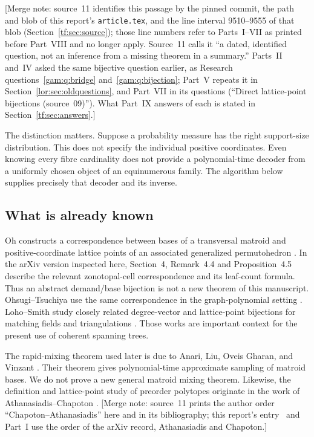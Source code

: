 \documentclass[11pt]{article}
\numberwithin{equation}{section}
\theoremstyle{definition}
\begin{document}
[Merge note: source~11 identifies this passage by the pinned commit, the
path and blob of this report's \texttt{article.tex}, and the line
interval 9510--9555 of that blob (Section~\ref{tf:sec:source}); those
line numbers refer to Parts~I--VII as printed before Part~VIII and no
longer apply. Source~11 calls it ``a dated, identified question, not an
inference from a missing theorem in a summary.'' Parts~II and~IV asked
the same bijective question earlier, as Research
questions~\ref{gam:q:bridge} and~\ref{gam:q:bijection}; Part~V repeats it
in Section~\ref{lor:sec:oldquestions}, and Part~VII in its questions
(``Direct lattice-point bijections (source~09)''). What Part~IX answers of
each is stated in Section~\ref{tf:sec:answers}.]

The distinction matters. Suppose a probability measure has the right
support-size distribution. This does not specify the individual positive
coordinates. Even knowing every fibre cardinality does not provide a
polynomial-time decoder from a uniformly chosen object of an equinumerous
family. The algorithm below supplies precisely that decoder and its inverse.

\subsection{What is already known}
Oh constructs a correspondence between bases of a transversal matroid and
positive-coordinate lattice points of an associated generalized
permutohedron \cite{Oh}. In the arXiv version inspected here,
Section~4, Remark~4.4 and Proposition~4.5 describe the relevant
zonotopal-cell correspondence and its leaf-count formula. Thus an
abstract demand/base bijection is not a new theorem of this manuscript.
Ohsugi--Tsuchiya use the same correspondence in the graph-polynomial
setting \cite{OT20}. Loho--Smith study closely related degree-vector and
lattice-point bijections for matching fields and triangulations
\cite{LohoSmith}. Those works are important context for the present use of
coherent spanning trees.

The rapid-mixing theorem used later is due to Anari, Liu, Oveis Gharan,
and Vinzant \cite{ALOV}. Their theorem gives polynomial-time approximate
sampling of matroid bases. We do not prove a new general matroid mixing
theorem. Likewise, the definition and lattice-point study of preorder
polytopes originate in the work of Athanasiadis--Chapoton \cite{AC}.
[Merge note: source~11 prints the author order ``Chapoton--Athanasiadis''
here and in its bibliography; this report's entry~\cite{AC} and Part~I
use the order of the arXiv record, Athanasiadis and Chapoton.]
\end{document}
